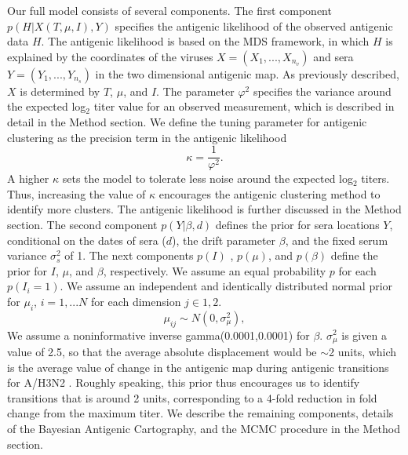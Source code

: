 \documentclass[11pt,oneside,letterpaper]{article}
\newcommand{\mdssd}{\varphi}						%
\begin{document}
Our full model consists of several components.
The first component $p(H|X(T, \mu, I),Y )$ specifies the antigenic likelihood of the observed antigenic data $H$.
The antigenic likelihood is based on the MDS framework, in which $H$ is explained by the coordinates of the viruses $X=(X_1, ..., X_{n_v} )$ and sera $Y = (Y_1, ..., Y_{n_{s}} )$  in the two dimensional antigenic map.
As previously described, $X$ is determined by $T$, $\mu$, and $I$.
The parameter $\mdssd^2$ specifies the variance around the expected log$_2$ titer value for an observed measurement, which is described in detail in the Method section.
We define the tuning parameter for antigenic clustering as the precision term in the antigenic likelihood
\begin{equation}
  \kappa = \frac{1}{\mdssd^2}.
\end{equation}
A higher $\kappa$ sets the model to tolerate less noise around the expected log$_2$ titers.
Thus, increasing the value of $\kappa$ encourages the antigenic clustering method to identify more clusters.
The antigenic likelihood is further discussed in the Method section.
The second component $p(Y|  \beta , d)$ defines the prior for sera locations $Y$, conditional on the dates of sera ($d$), the drift parameter $\beta$, and the fixed serum variance $\sigma^2_s$ of 1. 
The next components $p(I)$ , $p(\mu)$, and $p(\beta)$ define the prior for $I$, $\mu$, and $\beta$, respectively.
We assume an equal probability $p$ for each $p(I_i = 1)$.
We assume an independent and identically distributed normal prior for $\mu_i$, $i=1,...N$ for each dimension $j \in {1,2}$.
\begin{equation}
   \mu_{ij}  \sim N( 0 , \sigma^2_\mu)			,
\end{equation}
We assume a noninformative inverse gamma(0.0001,0.0001) for $\beta$.
$\sigma^2_\mu$ is given a value of 2.5, so that the average absolute displacement would be $\sim$2 units, which is the average value of change in the antigenic map during antigenic transitions for A/H3N2 \cite{jong_antigenic_2007}.
Roughly speaking, this prior thus encourages us to identify transitions that is around 2 units, corresponding to a 4-fold reduction in fold change from the maximum titer.
We describe the remaining components, details of the Bayesian Antigenic Cartography, and the MCMC procedure in the Method section.
\end{document}
